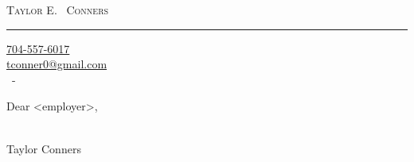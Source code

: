 \documentclass[12p4]{article}
\makeatletter
\def\myemail{tconner0@gmail.com}
\def\myphone{704-557-6017}
\def\myweb{tconners087}
\makeatother
\begin{document}
\pagestyle{fancy} \setlength\headwidth{6.5in}
 \cfoot{}
\thispagestyle{empty}

\setlength{\headsep}{0.1625in}

\begin{flushright}
{\Huge\hfill
	{\textsc{
		{T}aylor
		{E}.~%
		{C}onners}%
	}
}\\
\rule{9cm}{0.15pt}
\end{flushright}



\hfill
\begin{minipage}[t]{2.75in}
	{
	}
	{
		\begin{footnotesize}
		\hfill \href{tel:\myphone}{\myphone} \\ 
		\hfill \href{mailto:\myemail}{\myemail} \\
		\hfill \href{https://www.github.com/\myweb}{\faGithub}~-~\href{https://www.linkedin.com/in/\myweb}{\faLinkedin}
		\end{footnotesize}
	}
\end{minipage}

\medskip
\medskip

Dear <employer>, \\
\doublespace
\indent\lipsum[1-4]

\begin{flushright}
\begin{minipage}[t]{2.75in}
	 \\
	\medskip
	{\LARGE
		{
			{T}aylor
			{C}onners%
		}
	}
\end{minipage}
\end{flushright}
\end{document}
